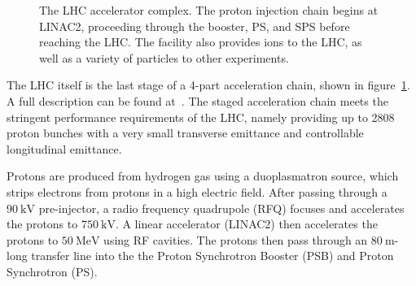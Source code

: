 \begin{figure}[htbp]
	\centering
	\caption{The LHC accelerator complex. The proton injection chain begins at LINAC2, proceeding through the booster, PS, and SPS before reaching the LHC. The facility also provides ions to the LHC, as well as a variety of particles to other experiments.}
	\label{fig:LHC-accelerator-complex}
\end{figure}


The LHC itself is the last stage of a 4-part acceleration chain, shown in figure~\ref{fig:LHC-accelerator-complex}. A full description can be found at~\cite{Benedikt:2004wm}. The staged acceleration chain meets the stringent performance requirements of the LHC, namely providing up to 2808 proton bunches with a very small transverse emittance and controllable longitudinal emittance. 

Protons are produced from hydrogen gas using a duoplasmatron source, which strips electrons from protons in a high electric field. After passing through a $90~\mbox{kV}$ pre-injector, a radio frequency quadrupole (RFQ) focuses and accelerates the protons to $750~\mbox{kV}$. A linear accelerator (LINAC2) then accelerates the protons to $50~\mbox{MeV}$ using RF cavities. The protons then pass through an $80~\mbox{m}$-long transfer line into the the Proton Synchrotron Booster (PSB) and Proton Synchrotron (PS). 

